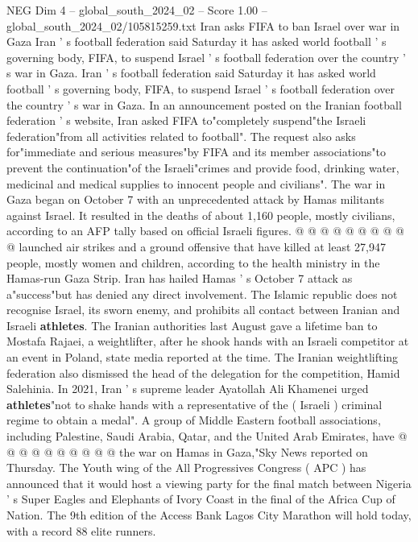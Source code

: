 \begin{textsample}{NEG Dim 4 – global\_south\_2024\_02 – Score 1.00 – global\_south\_2024\_02/105815259.txt}  \label{ex:f4_neg_385}
Iran asks FIFA to ban Israel over war in Gaza Iran ' s football federation said Saturday it has asked world football ' s governing body, FIFA, to suspend Israel ' s football federation over the country ' s war in Gaza.
Iran ' s football federation said Saturday it has asked world football ' s governing body, FIFA, to suspend Israel ' s football federation over the country ' s war in Gaza.
In an announcement posted on the Iranian football federation ' s website, Iran asked FIFA to"completely suspend"the Israeli federation"from all activities related to football".
The request also asks for"immediate and serious measures"by FIFA and its member associations"to prevent the continuation"of the Israeli"crimes and provide food, drinking water, medicinal and medical supplies to innocent people and civilians".
The war in Gaza began on October 7 with an unprecedented attack by Hamas militants against Israel.
It resulted in the deaths of about 1,160 people, mostly civilians, according to an AFP tally based on official Israeli figures. @ @ @ @ @ @ @ @ @ @ launched air strikes and a ground offensive that have killed at least 27,947 people, mostly women and children, according to the health ministry in the Hamas-run Gaza Strip.
Iran has hailed Hamas ' s October 7 attack as a"success"but has denied any direct involvement.
The Islamic republic does not recognise Israel, its sworn enemy, and prohibits all contact between Iranian and Israeli \textbf{athletes}.
The Iranian authorities last August gave a lifetime ban to Mostafa Rajaei, a weightlifter, after he shook hands with an Israeli competitor at an event in Poland, state media reported at the time.
The Iranian weightlifting federation also dismissed the head of the delegation for the competition, Hamid Salehinia.
In 2021, Iran ' s supreme leader Ayatollah Ali Khamenei urged \textbf{athletes}"not to shake hands with a representative of the ( Israeli ) criminal regime to obtain a medal".
A group of Middle Eastern football associations, including Palestine, Saudi Arabia, Qatar, and the United Arab Emirates, have @ @ @ @ @ @ @ @ @ @ the war on Hamas in Gaza,"Sky News reported on Thursday.
The Youth wing of the All Progressives Congress ( APC ) has announced that it would host a viewing party for the final match between Nigeria ' s Super Eagles and Elephants of Ivory Coast in the final of the Africa Cup of Nation.
The 9th edition of the Access Bank Lagos City Marathon will hold today, with a record 88 elite runners.

\end{textsample}
